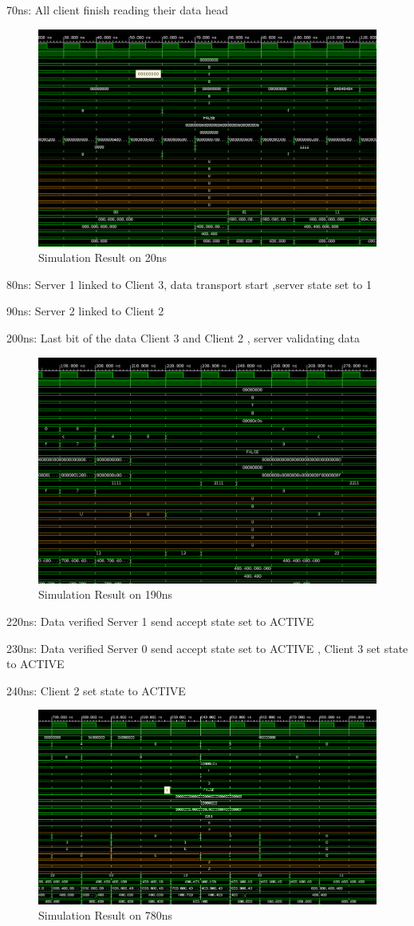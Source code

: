 70ns:     All client finish reading their data head 

\begin{figure}[htb]
	\centering
	\includegraphics[width=.7\linewidth]{figures/new-sim/sim-20ns.png}
	\caption{Simulation Result on 20ns}
	\label{fig:sim-20}
\end{figure}

\newpage
80ns:     Server 1 linked to Client 3, data transport start ,server state set to 1 

90ns:     Server 2 linked to Client 2 

200ns:    Last bit of the data Client 3 and Client 2 , server validating data 

\begin{figure}[htb]
	\centering
	\includegraphics[width=.7\linewidth]{figures/new-sim/sim-190ns.png}
	\caption{Simulation Result on 190ns}
	\label{fig:sim-190}
\end{figure}

\newpage
220ns:    Data verified Server 1 send accept state set to ACTIVE 

230ns:    Data verified Server 0 send accept state set to ACTIVE ,  Client 3 set state to ACTIVE

240ns:    Client 2 set state to ACTIVE

\begin{figure}[htb]
	\centering
	\includegraphics[width=.7\linewidth]{figures/new-sim/sim-780ns.png}
	\caption{Simulation Result on 780ns}
	\label{fig:sim-780}
\end{figure}

